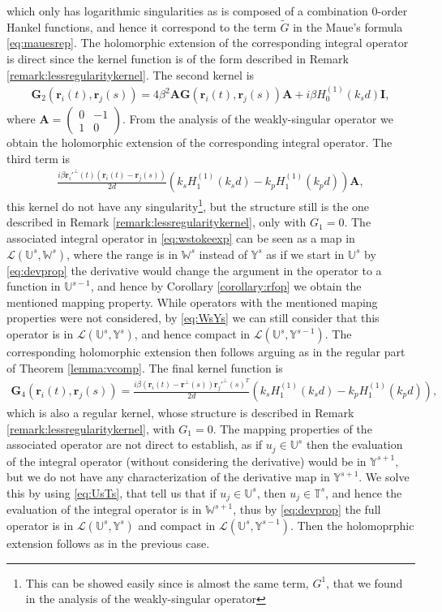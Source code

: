 \documentclass{article}
\newcommand{\IU}{{\mathbb U}}
\newcommand{\IT}{{\mathbb T}}
\newcommand{\IW}{{\mathbb W}}
\newcommand{\IY}{{\mathbb Y}}
\newcommand{\br}{\bm{r}}
\begin{document}
which only has  logarithmic singularities as is composed of a combination 0-order Hankel functions, and hence it correspond to the term $\widetilde{G}$ in the Maue's formula \eqref{eq:mauesrep}. The holomorphic extension of the corresponding integral operator is direct since the kernel function is of the form described in Remark \ref{remark:lessregularitykernel}. The second kernel is 
\begin{align*}
\mathbf{G}_2(\br_i(t),\br_j(s))=
4\beta^2 \mathbf{A}\mathbf{G}(\br_i(t),\br_j(s)) \mathbf{A} + i \beta H_0^{(1)}(k_s d)\mathbf{I},
\end{align*}
where $\mathbf{A} = \begin{pmatrix}
0&-1\\1&0
\end{pmatrix}$. From the analysis of the weakly-singular operator we obtain the holomorphic extension of the corresponding integral operator. The third term is
\begin{align*}
\frac{i \beta \br_i'^\perp(t)(\br_i(t)-\br_j(s))}{2d}  \left(
k_s H^{(1)}_1(k_s d)  -
 k_p H^{(1)}_1(k_p d) 
\right)\mathbf{A},
\end{align*}
this kernel do not have any singularity\footnote{This can be showed easily since is almost the same term, $G^1$, that we found in the analysis of the weakly-singular operator}, but the structure still is the one described in Remark \ref{remark:lessregularitykernel}, only with $G_1 = 0$. The associated integral operator in \eqref{eq:wstokeexp} can be seen as a map in $\mathcal{L}\left( \IU^s,\IW^s \right)$, where the range is in $\IW^s$ instead of $\IY^s$ as if we start in $\IU^s$ by \eqref{eq:devprop} the derivative would change the argument in the operator to a function in $\IU^{s-1}$, and hence by Corollary \ref{corollary:rfop} we obtain the mentioned mapping property. While operators with the mentioned maping properties were not considered, by \eqref{eq:WsYs} we can still consider that this operator is in $\mathcal{L}\left(\IU^s,\IY^s \right)$, and hence compact in  $\mathcal{L}\left(\IU^s,\IY^{s-1} \right)$. The corresponding holomorphic extension then follows  arguing as in the regular part of Theorem \ref{lemma:vcomp}. The final kernel function is   
\begin{align*}
\mathbf{G}_4(\br_i(t),\br_j(s)) = \frac{i\beta (\br_i(t)-\br^\perp(s))\br_j'^\perp(s)^T}{2d}
\left(
k_s H^{(1)}_1(k_s d)  -
k_p H^{(1)}_1(k_p d)
\right),
\end{align*}
which is also a regular kernel, whose structure is described in Remark \ref{remark:lessregularitykernel}, with $G_1 =0$. The mapping properties of the associated operator are not direct to establish, as if $u_j \in \IU^s$ then the evaluation of the integral operator (without considering the derivative) would be in $\IY^{s+1}$, but we do not have any characterization of the derivative map in $\IY^{s+1}$. We solve this by using \eqref{eq:UsTs}, that tell us that if $u_j \in \IU^s$, then $u_j \in \IT^s$, and hence the evaluation of the integral operator is in $\IW^{s+1}$, thus by \eqref{eq:devprop} the full operator is in $\mathcal{L}\left(\IU^s,\IY^s\right)$ and compact in $\mathcal{L}\left(\IU^s,\IY^{s-1}\right)$. Then the holomoprphic extension follows as in the previous case. 
\end{document}
